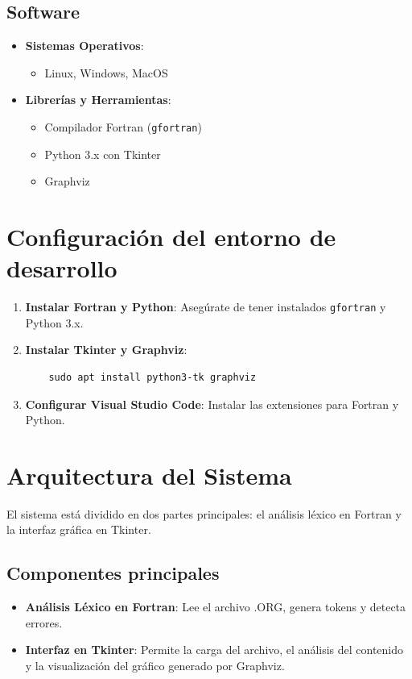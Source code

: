 \documentclass[12pt, letterpaper, twosite]{article}
\begin{document}
\subsection{Software}
\begin{itemize}
    \item \textbf{Sistemas Operativos}: 
    \begin{itemize}
        \item Linux, Windows, MacOS
    \end{itemize}
    \item \textbf{Librerías y Herramientas}:
    \begin{itemize}
        \item Compilador Fortran (\texttt{gfortran})
        \item Python 3.x con Tkinter
        \item Graphviz
    \end{itemize}
\end{itemize}

\section{Configuración del entorno de desarrollo}
\begin{enumerate}
    \item \textbf{Instalar Fortran y Python}: Asegúrate de tener instalados \texttt{gfortran} y Python 3.x.
    \item \textbf{Instalar Tkinter y Graphviz}:
    \begin{verbatim}
    sudo apt install python3-tk graphviz
    \end{verbatim}
    \item \textbf{Configurar Visual Studio Code}: Instalar las extensiones para Fortran y Python.
\end{enumerate}

\section{Arquitectura del Sistema}
El sistema está dividido en dos partes principales: el análisis léxico en Fortran y la interfaz gráfica en Tkinter.

\subsection{Componentes principales}
\begin{itemize}
    \item \textbf{Análisis Léxico en Fortran}: Lee el archivo .ORG, genera tokens y detecta errores.
    \item \textbf{Interfaz en Tkinter}: Permite la carga del archivo, el análisis del contenido y la visualización del gráfico generado por Graphviz.
\end{itemize}
\end{document}
